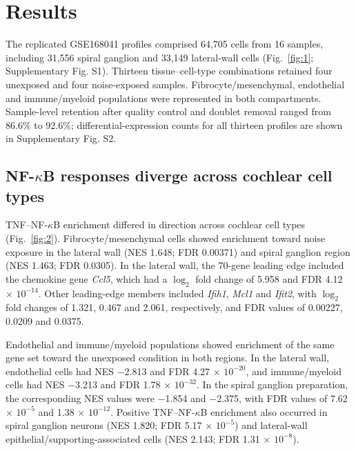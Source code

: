 \section{Results}

The replicated GSE168041 profiles comprised 64,705 cells from 16 samples, including 31,556 spiral ganglion and 33,149 lateral-wall cells (Fig.~\ref{fig:1}; Supplementary Fig. S1). Thirteen tissue--cell-type combinations retained four unexposed and four noise-exposed samples. Fibrocyte/\allowbreak{}mesenchymal, endothelial and immune/\allowbreak{}myeloid populations were represented in both compartments. Sample-level retention after quality control and doublet removal ranged from 86.6\% to 92.6\%; differential-expression counts for all thirteen profiles are shown in Supplementary Fig. S2.

\subsection{NF-\texorpdfstring{\(\kappa\)}{kappa}B responses diverge across cochlear cell types}

TNF--NF-\(\kappa\)B enrichment differed in direction across cochlear cell types (Fig.~\ref{fig:2}). Fibrocyte/\allowbreak{}mesenchymal cells showed enrichment toward noise exposure in the lateral wall (NES 1.648; FDR 0.00371) and spiral ganglion region (NES 1.463; FDR 0.0305). In the lateral wall, the 70-gene leading edge included the chemokine gene \mbox{\textit{Ccl5}}, which had a \(\log_2\) fold change of 5.958 and FDR 4.12 \(\times\) \(10^{-14}\). Other leading-edge members included \mbox{\textit{Ifih1}}, \mbox{\textit{Mcl1}} and \mbox{\textit{Ifit2}}, with \(\log_2\) fold changes of 1.321, 0.467 and 2.061, respectively, and FDR values of 0.00227, 0.0209 and 0.0375.

Endothelial and immune/\allowbreak{}myeloid populations showed enrichment of the same gene set toward the unexposed condition in both regions. In the lateral wall, endothelial cells had NES \(-\)2.813 and FDR 4.27 \(\times\) \(10^{-20}\), and immune/\allowbreak{}myeloid cells had NES \(-\)3.213 and FDR 1.78 \(\times\) \(10^{-32}\). In the spiral ganglion preparation, the corresponding NES values were \(-\)1.854 and \(-\)2.375, with FDR values of 7.62 \(\times\) \(10^{-5}\) and 1.38 \(\times\) \(10^{-12}\). Positive TNF--NF-\(\kappa\)B enrichment also occurred in spiral ganglion neurons (NES 1.820; FDR 5.17 \(\times\) \(10^{-5}\)) and lateral-wall epithelial/\allowbreak{}supporting-associated cells (NES 2.143; FDR 1.31 \(\times\) \(10^{-8}\)).

